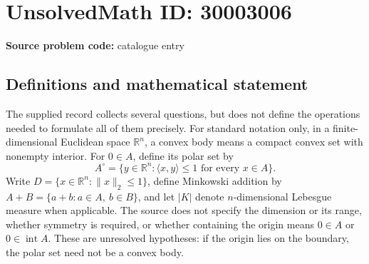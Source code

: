 \documentclass[11pt]{article}
\newcommand{\R}{\mathbb{R}}
\begin{document}
\section*{UnsolvedMath ID: 30003006}
\textbf{Source problem code:} catalogue entry
\subsection{Definitions and mathematical statement}
The supplied record collects several questions, but does not define the operations needed to formulate all of them precisely. For standard notation only, in a finite-dimensional Euclidean space \(\R^n\), a convex body means a compact convex set with nonempty interior. For \(0\in A\), define its polar set by
\[
A^\circ=\{y\in\R^n:\langle x,y\rangle\leq 1\text{ for every }x\in A\}.
\]
Write \(D=\{x\in\R^n:\|x\|_2\leq 1\}\), define Minkowski addition by \(A+B=\{a+b:a\in A,\ b\in B\}\), and let \(|K|\) denote \(n\)-dimensional Lebesgue measure when applicable. The source does not specify the dimension or its range, whether symmetry is required, or whether containing the origin means \(0\in A\) or \(0\in\operatorname{int}A\). These are unresolved hypotheses: if the origin lies on the boundary, the polar set need not be a convex body.
\end{document}

